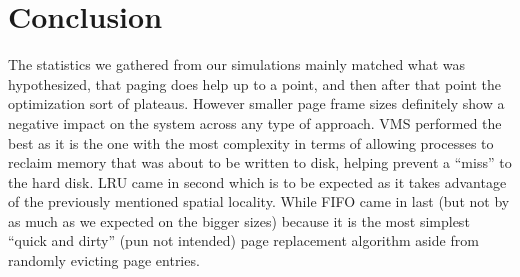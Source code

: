 \documentclass[12pt,letterpaper]{article}
\begin{document}
	\section{Conclusion}
	The statistics we gathered from our simulations mainly matched what was hypothesized, that paging does help up to a point, and then after that point the optimization sort of plateaus. However smaller page frame sizes definitely show a negative impact on the system across any type of approach. VMS performed the best as it is the one with the most complexity in terms of allowing processes to reclaim memory that was about to be written to disk, helping prevent a ``miss'' to the hard disk. LRU came in second which is to be expected as it takes advantage of the previously mentioned spatial locality. While FIFO came in last (but not by as much as we expected on the bigger sizes) because it is the most simplest ``quick and dirty'' (pun not intended) page replacement algorithm aside from randomly evicting page entries.
	
\end{document}
